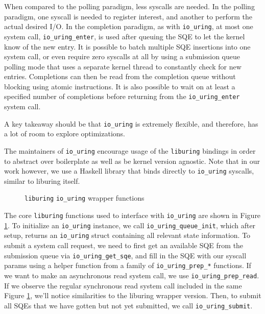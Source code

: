 When compared to the polling paradigm, less syscalls are needed.
In the polling paradigm, one syscall is needed to register interest, and
another to perform the actual desired I/O. In the completion paradigm, as
with \texttt{io\_uring}, at most one system call, \texttt{io\_uring\_enter},
is used after queuing the
SQE to let the kernel know of the new entry. It is possible
to batch multiple SQE insertions into one system call, or even require zero
syscalls at all by using a submission queue polling mode that uses a separate
kernel thread to constantly check for new entries.
Completions can then be read from the completion queue without blocking
using atomic instructions. It is also possible to wait on at least a specified
number of completions before returning from the \texttt{io\_uring\_enter} system call.

A key takeaway should be that \texttt{io\_uring} is extremely flexible, and
therefore, has a lot of room to explore optimizations.

The maintainers of \texttt{io\_uring} encourage usage of the \texttt{liburing} bindings
in order to abstract over boilerplate as well as be kernel version agnostic.
Note that in our work however, we use a Haskell library that binds directly to
\texttt{io\_uring} syscalls, similar to liburing itself.

\begin{figure}
  \centering
  
  \caption[\texttt{liburing io\_uring} wrapper functions]{
  \texttt{liburing} \texttt{io\_uring} wrapper functions}
  \label{fig:liburing.h}
\end{figure}

The core \texttt{liburing} functions used to interface with \texttt{io\_uring} are shown in Figure
\ref{fig:liburing.h}.
To initialize an \texttt{io\_uring} instance, we call
\texttt{io\_uring\_queue\_init}, which after setup,
returns an \texttt{io\_uring} struct containing all relevant state information.
To submit a system call request, we need to first get an available SQE
from the submission queue via \texttt{io\_uring\_get\_sqe}, and fill in the SQE with
our syscall params using a helper function from a family of
\texttt{io\_uring\_prep\_*}
functions. If we want to make an asynchronous read system call,
we use \texttt{io\_uring\_prep\_read}.
If we observe the regular synchronous read system call included
in the same Figure \ref{fig:liburing.h},
we’ll notice similarities to the liburing wrapper version.
Then, to submit all SQEs that we have gotten but not yet submitted, we call
\texttt{io\_uring\_submit}.


